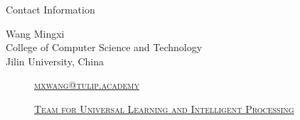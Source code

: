 \documentclass[
 size=14pt,
 paper=smartboard,  %
 mode=present, 		%
 display=slides, 	%
 style=tuliplab,  	%
 pauseslide,
 fleqn,leqno]{powerdot}
\begin{document}





\begin{wideslide}[toc=,bm=]{Contact Information}
\centering
{}
\twocolumn[
lcolwidth=0.35\linewidth,
rcolwidth=0.65\linewidth
]
{
}
{
Wang Mingxi\\
College of Computer Science and Technology\\
Jilin University, China
\begin{description}
 \item[\textcolor{orange}{\faEnvelope}] \href{mailto:mxwang@tulip.academy}
 {\textsc{\footnotesize{mxwang@tulip.academy}}}

 \item[\textcolor{orange}{\faHome}] \href{http://www.tulip.org.au}
 {\textsc{\footnotesize{Team for Universal Learning and Intelligent Processing}}}
\end{description}
}
\end{wideslide}
\end{document}
